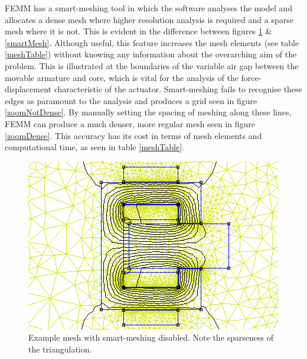 \documentclass[a4paper]{IEEEtran}
\begin{document}
    FEMM has a smart-meshing tool in which the software analyses the model and allocates a dense mesh where higher resolution analysis is required and a sparse mesh where it is not. This is evident in the difference between figures \ref{noSmartMesh} \& \ref{smartMesh}. Although useful, this feature increases the mesh elements (see table \ref{meshTable}) without knowing any information about the overarching aim of the problem. This is illustrated at the boundaries of the variable air gap between the movable armature and core, which is vital for the analysis of the force-displacement characteristic of the actuator. Smart-meshing fails to recognise these edges as paramount to the analysis and produces a grid seen in figure \ref{zoomNotDense}. By manually setting the spacing of meshing along these lines, FEMM can produce a much denser, more regular mesh seen in figure \ref{zoomDense}. This accuracy has its cost in terms of mesh elements and computational time, as seen in table \ref{meshTable}.

    \begin{figure}[ht]
        \includegraphics[width = \linewidth]{Smartmesh-OFF-NotDenseAirgap.png}
        \caption{Example mesh with smart-meshing disabled. Note the sparseness of the triangulation.}
        \label{noSmartMesh} 
    \end{figure}
\end{document}
